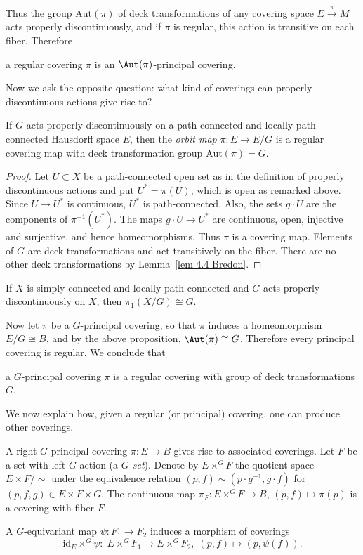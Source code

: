 Thus the group $\mathrm{Aut}(\pi)$ of deck transformations of any covering space $E\overset{\pi}{\to}M$ acts properly discontinuously, and if $\pi$ is regular, this action is transitive on each fiber. Therefore 
\begin{center}
    a regular covering $\pi$ is an $\Aut(\pi)$-principal covering.
\end{center}

Now we ask the opposite question: what kind of coverings can properly discontinuous actions give rise to?

\begin{prop}
    If $G$ acts properly discontinuously on a path-connected and locally path-connected Hausdorff space $E$, then the \emph{orbit map} $\pi:E\to E\slash G$ is a regular covering map with deck transformation group $\mathrm{Aut}(\pi)=G$.
\end{prop}
\begin{proof}
    Let $U\subset X$ be a path-connected open set as in the definition of properly discontinuous actions and put $U^\ast =\pi(U)$, which is open as remarked above. Since $U\to U^\ast$ is continuous, $U^\ast$ is path-connected. Also, the sets $g\cdot U$ are the components of $\pi^{-1}(U^\ast)$. The maps $g\cdot U\to U^\ast$ are continuous, open, injective and surjective, and hence homeomorphisms. Thus $\pi$ is a covering map. Elements of $G$ are deck transformations and act transitively on the fiber. There are no other deck transformations by Lemma~\ref{lem 4.4 Bredon}.
\end{proof}
\begin{cor}
    If $X$ is simply connected and locally path-connected and $G$ acts properly discontinuously on $X$, then $\pi_1(X\slash G)\cong G$.
\end{cor}


Now let $\pi$ be a $G$-principal covering, so that $\pi$ induces a homeomorphism $E\slash G\cong B$, and by the above proposition, $\Aut(\pi)\cong G$. Therefore every principal covering is regular. We conclude that 
\begin{center}
    a $G$-principal covering $\pi$ is a regular covering with group of deck transformations $G$.
\end{center}


We now explain how, given a regular (or principal) covering, one can produce other coverings.

\begin{defn}
    A right $G$-principal covering $\pi:E\to B$ gives rise to associated coverings. Let $F$ be a set with left $G$-action (a \emph{$G$-set}). Denote by $E\times^G F$ the quotient space $E\times F\slash \sim $ under the equivalence relation $(p,f)\sim(p\cdot g^{-1},g\cdot f)$ for $(p,f,g)\in E\times F\times G$. The continuous map $\pi_F:E\times^G F\to B$, $(p,f)\mapsto \pi(p)$ is a covering with fiber $F$.

    A $G$-equivariant map $\psi:F_1\to F_2$ induces a morphism of coverings
    \[\mathrm{id}_E\times^G\psi: \; E\times^G F_1\to E \times^G F_2,\; (p,f)\mapsto (p,\psi(f)).\]
\end{defn}

